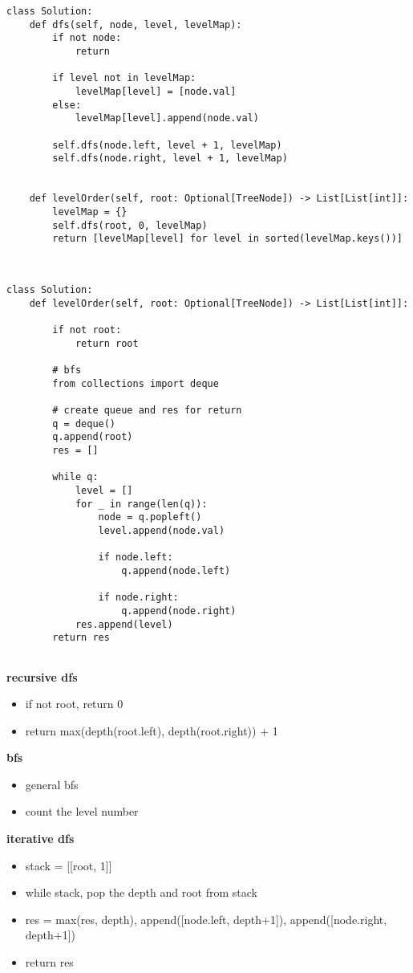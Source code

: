 \documentclass{assignmeownt}
\begin{document}
\begin{lstlisting}[caption = level ordr traversal dp]
    class Solution:
    def dfs(self, node, level, levelMap):
        if not node:
            return
        
        if level not in levelMap:
            levelMap[level] = [node.val]
        else:
            levelMap[level].append(node.val)
            
        self.dfs(node.left, level + 1, levelMap)
        self.dfs(node.right, level + 1, levelMap)

        
    def levelOrder(self, root: Optional[TreeNode]) -> List[List[int]]:
        levelMap = {}
        self.dfs(root, 0, levelMap)
        return [levelMap[level] for level in sorted(levelMap.keys())]
    
        

\end{lstlisting}


\begin{lstlisting}[caption = level order traversal bfs]
class Solution:
    def levelOrder(self, root: Optional[TreeNode]) -> List[List[int]]:

        if not root:
            return root

        # bfs
        from collections import deque

        # create queue and res for return
        q = deque()
        q.append(root)
        res = []

        while q:
            level = []
            for _ in range(len(q)):
                node = q.popleft()
                level.append(node.val)

                if node.left:
                    q.append(node.left)
                
                if node.right:
                    q.append(node.right)
            res.append(level)
        return res
                    
\end{lstlisting}


\textbf{recursive dfs}
\begin{itemize}
    \item if not root, return 0
    \item return max(depth(root.left), depth(root.right)) + 1
\end{itemize}
\textbf{bfs}
\begin{itemize}
    \item general bfs
    \item count the level number 
\end{itemize}
\textbf{iterative dfs}
\begin{itemize}
    \item stack = [[root, 1]]
    \item while stack, pop the depth and root from stack
    \item res = max(res, depth), append([node.left, depth+1]), append([node.right, depth+1])
    \item return res
\end{itemize}
\end{document}
